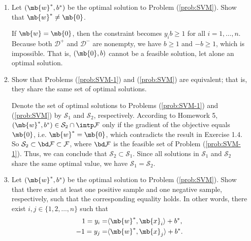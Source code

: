 \begin{exercise}
\begin{enumerate}
        \item Let $(\mb{w}^*,b^*)$ be the optimal solution to Problem (\ref{prob:SVM}). Show that $\mb{w}^*\neq\mb{0}$.

            \begin{solution}
                If $\mb{w}=\mb{0}$, then the constraint becomes $y_i b \ge 1$ for all $i = 1,\ldots,n$. Because both $\mathcal{D}^+$ and $\mathcal{D}^-$ are nonempty, we have $b \ge 1$ and $-b \ge 1$, which is impossible. That is, $(\mb{0},b)$ cannot be a feasible solution, let alone an optimal solution.
            \end{solution}


        \item Show that Problems (\ref{prob:SVM-1}) and (\ref{prob:SVM}) are equivalent; that is, they share the same set of optimal solutions.

            \begin{solution}
                Denote the set of optimal solutions to Problems (\ref{prob:SVM-1}) and (\ref{prob:SVM}) by $\mathcal{S}_1$ and $\mathcal{S}_2$, respectively. According to Homework 5, $(\mb{w}^*,b^*) \in \mathcal{S}_2 \cap \intp \mathcal{F}$ only if the gradient of the objective equals $\mb{0}$, i.e. $\mb{w}^* = \mb{0}$, which contradicts the result in Exercise 1.4. So $\mathcal{S}_2 \subset \bd \mathcal{F} \subset \mathcal{F}$, where $\bd \mathcal{F}$ is the feasible set of Problem (\ref{prob:SVM-1}). Thus, we can conclude that $\mathcal{S}_2 \subset \mathcal{S}_1$. Since all solutions in $\mathcal{S}_1$ and $\mathcal{S}_2$ share the same optimal value, we have $\mathcal{S}_1 = \mathcal{S}_2$.
            \end{solution}


        \item Let $(\mb{w}^*,b^*)$ be the optimal solution to Problem (\ref{prob:SVM}). Show that there exist at least one positive sample and one negative sample, respectively, such that the corresponding equality holds. In other words, there exist $i,j \in \{ 1,2,\dots,n \}$ such that
            \begin{align*}
                1=y_i =  & \langle \mb{w}^*, \mb{x}_i \rangle + b^*, \\
                -1=y_j = & \langle \mb{w}^*, \mb{x}_j \rangle + b^*.
            \end{align*}


\end{enumerate}
\end{exercise}
